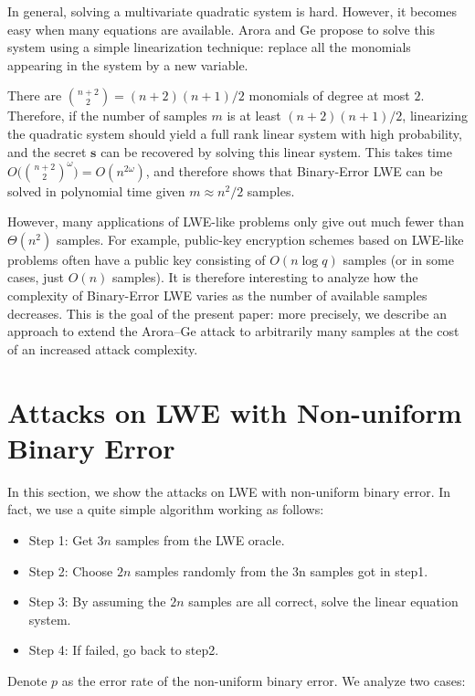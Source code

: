 \documentclass[a4paper]{article}
\theoremstyle{definition}
\theoremstyle{remark}
\renewcommand{\vec}{\mathbf}
\begin{document}
In general, solving a multivariate quadratic system is hard. However,
it becomes easy when many equations are available. Arora and Ge propose
to solve this system using a simple linearization technique: replace all
the monomials appearing in the system by a new variable.

There are $\binom{n+2}{2} = (n+2)(n+1)/2$ monomials of degree at most
$2$. Therefore, if the number of samples $m$ is at least $(n+2)(n+1)/2$,
linearizing the quadratic system should yield a full rank linear system
with high probability, and the secret $\vec s$ can be recovered by
solving this linear system. This takes time
$O\Big(\binom{n+2}{2}^\omega\Big) = O(n^{2\omega})$, and therefore
shows that Binary-Error LWE can be solved in polynomial time given
$m\approx n^2/2$ samples.

However, many applications of LWE-like problems only give out much fewer
than $\Theta(n^2)$ samples. For example, public-key encryption schemes
based on LWE-like problems often have a public key consisting of $O(n\log
q)$ samples (or in some cases, just $O(n)$ samples). It is therefore
interesting to analyze how the complexity of Binary-Error LWE varies as
the number of available samples decreases. This is the goal of the
present paper: more precisely, we describe an approach to extend the
Arora--Ge attack to arbitrarily many samples at the cost of an increased
attack complexity.
\section{Attacks on LWE with Non-uniform Binary Error}
In this section, we show the attacks on LWE with non-uniform binary error. 
In fact, we use a quite simple algorithm working as follows:
\begin{itemize}
  \item Step 1: Get $3n$ samples from the LWE oracle.
  \item Step 2: Choose $2n$ samples randomly from the 3n samples got in step1.
  \item Step 3: By assuming the $2n$ samples are all correct, solve the linear equation system.
  \item Step 4: If failed, go back to step2. 
\end{itemize}
Denote $p$ as the error rate of the non-uniform binary error. We analyze two cases:
\end{document}
